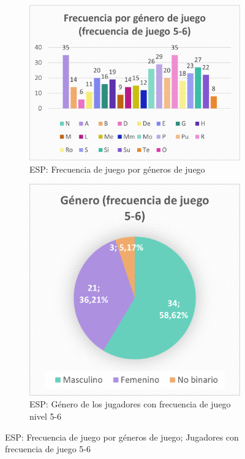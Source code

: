 \documentclass[12pt, a4paper,twoside,titlepage]{book}
\begin{document}
\begin{figure}
\centering
\begin{subfigure}{.6\textwidth}
  \centering
  \includegraphics[width=.95\linewidth]{ANEXO ESP/5AnexESPgen56}
  \caption{ESP: Frecuencia de juego por géneros de juego}
\end{subfigure}%
\begin{subfigure}{.4\textwidth}
  \centering
  \includegraphics[width=.95\linewidth]{ANEXO ESP/6AnexESPgen56}
  \caption{ESP: Género de los jugadores con frecuencia de juego nivel 5-6}
\end{subfigure}
\caption{ESP: Frecuencia de juego por géneros de juego; Jugadores con frecuencia de juego 5-6}
\end{figure}
\end{document}
